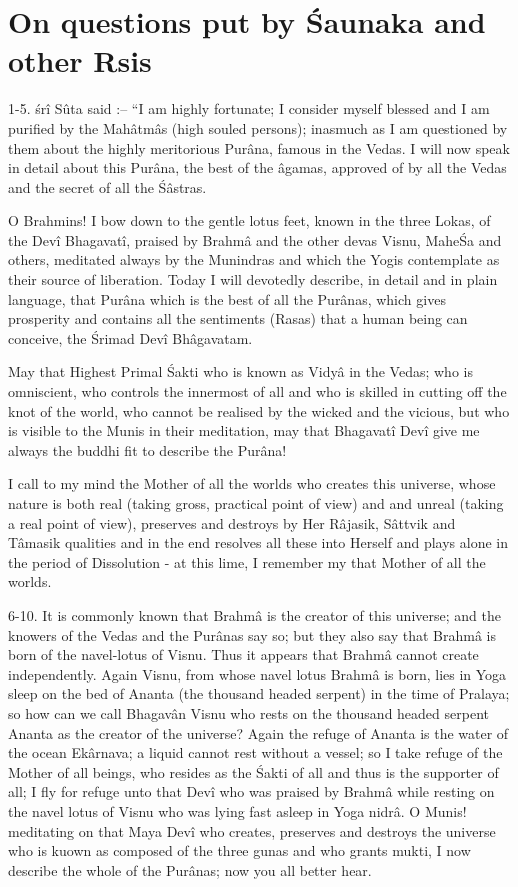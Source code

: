 \chapter{On questions put by \'Saunaka and other Rsis}

1-5. \'sr\^i S\^uta said :-- ``I am highly fortunate; I consider myself blessed and I am purified by the Mah\^atm\^as (high souled persons); inasmuch as I am questioned by them about the highly meritorious Pur\^ana, famous in the Vedas. I will now speak in detail about this Pur\^ana, the best of the \^agamas, approved of by all the Vedas and the secret of all the \'S\^astras.

O Brahmins! I bow down to the gentle lotus feet, known in the three Lokas, of the Dev\^i Bhagavat\^i, praised by Brahm\^a and the other devas Visnu, Mahe\'Sa and others, meditated always by the Munindras and which the Yogis contemplate as their source of liberation. Today I will devotedly describe, in detail and in plain language, that Pur\^ana which is the best of all the Pur\^anas, which gives prosperity and contains all the sentiments (Rasas) that a human being can conceive, the \'Srimad Dev\^i Bh\^agavatam.

May that Highest Primal \'Sakti who is known as Vidy\^a in the Vedas; who is omniscient, who controls the innermost of all and who is skilled in cutting off the knot of the world, who cannot be realised by the wicked and the vicious, but who is visible to the Munis in their meditation, may that Bhagavat\^i Dev\^i give me always the buddhi fit to describe the Pur\^ana!

I call to my mind the Mother of all the worlds who creates this universe, whose nature is both real (taking  gross, practical point of view) and and unreal (taking a real point of view), preserves and destroys by Her R\^ajasik, S\^attvik and T\^amasik qualities and in the end resolves all these into Herself and plays alone in the period of Dissolution - at this lime, I remember my that Mother of all the worlds.

6-10. It is commonly known that Brahm\^a is the creator of this universe; and the knowers of the Vedas and the Pur\^anas say so; but they also say that Brahm\^a is born of the navel-lotus of Visnu. Thus it appears that Brahm\^a cannot create independently. Again Visnu, from whose navel lotus Brahm\^a is born, lies in Yoga sleep on the bed of Ananta (the thousand headed serpent) in the time of Pralaya; so how can we call Bhagav\^an Visnu who rests on the thousand headed serpent Ananta as the creator of the universe? Again the refuge of Ananta is the water of the ocean Ek\^arnava; a liquid cannot rest without a vessel; so I take refuge of the Mother of all beings, who resides as the \'Sakti of all and thus is the supporter of all; I fly for refuge unto that Dev\^i who was praised by Brahm\^a while resting on the navel lotus of Visnu who was lying fast asleep in Yoga nidr\^a. O Munis! meditating on that Maya Dev\^i who creates, preserves and destroys the universe who is kuown as composed of the three gunas and who grants mukti, I now describe the whole of the Pur\^anas; now you all better hear.

